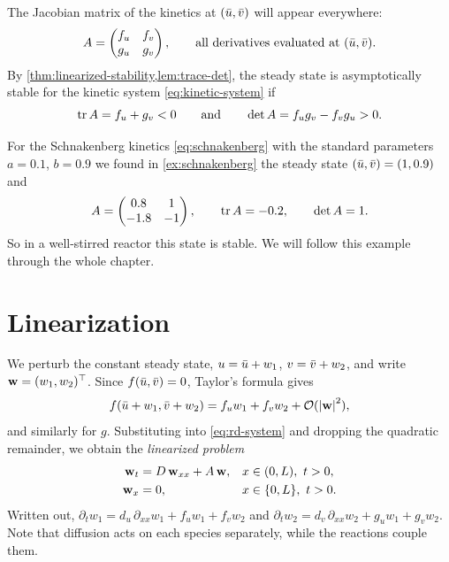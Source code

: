 The Jacobian matrix of the kinetics at $(\bar u,\bar v)$ will appear everywhere:
\begin{equation}\label{eq:jacobian-A}
  A = \begin{pmatrix} f_u & f_v\\ g_u & g_v\end{pmatrix},
  \qquad\text{all derivatives evaluated at } (\bar u,\bar v).
\end{equation}
By \cref{thm:linearized-stability,lem:trace-det}, the steady state is
asymptotically stable for the kinetic system \eqref{eq:kinetic-system} if
\begin{equation*}
  \operatorname{tr} A = f_u+g_v < 0 \qquad\text{and}\qquad \det A = f_ug_v-f_vg_u>0 .
\end{equation*}

\begin{example}\label{ex:turing-schnakenberg-setup}
For the Schnakenberg kinetics \eqref{eq:schnakenberg} with the standard parameters
$a=0.1$, $b=0.9$ we found in \cref{ex:schnakenberg} the steady state
$(\bar u,\bar v)=(1,0.9)$ and
\begin{equation*}
  A=\begin{pmatrix}0.8 & 1\\ -1.8 & -1\end{pmatrix},\qquad \operatorname{tr} A=-0.2,\qquad \det A=1 .
\end{equation*}
So in a well-stirred reactor this state is stable. We will follow this example
through the whole chapter.
\end{example}

\section{Linearization}\label{sec:turing-linearization}

We perturb the constant steady state, $u=\bar u+w_1$, $v=\bar v+w_2$, and write
$\mathbf{w}=(w_1,w_2)^{\top}$. Since $f(\bar u,\bar v)=0$, Taylor's formula gives
\begin{equation*}
  f(\bar u+w_1,\bar v+w_2) = f_u w_1 + f_v w_2 + \mathcal{O}(\left\lvert \mathbf{w}\right\rvert^2),
\end{equation*}
and similarly for $g$. Substituting into \eqref{eq:rd-system} and dropping the
quadratic remainder, we obtain the \emph{linearized problem}
\begin{equation}\label{eq:linearized-system}
\begin{aligned}
  \mathbf{w}_t &= D\,\mathbf{w}_{xx} + A\,\mathbf{w}, && x\in(0,L),\ t>0,\\
  \mathbf{w}_x &= 0, && x\in\{0,L\},\ t>0 .
\end{aligned}
\end{equation}
Written out, $\partial_t w_1 = d_u\,\partial_{xx}w_1 + f_u w_1 + f_v w_2$ and
$\partial_t w_2 = d_v\,\partial_{xx}w_2 + g_u w_1 + g_v w_2$. Note that diffusion
acts on each species separately, while the reactions couple them.

